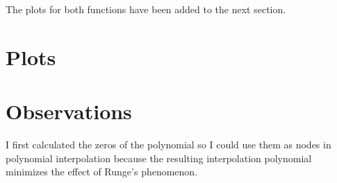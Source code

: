 \documentclass{article}
\begin{document}
The plots for both functions have been added to the next section.

\section{Plots}
\section{Observations}
I first calculated the zeros of the polynomial so I could use them as nodes in polynomial interpolation because the resulting interpolation polynomial minimizes the effect of Runge's phenomenon.
\end{document}
